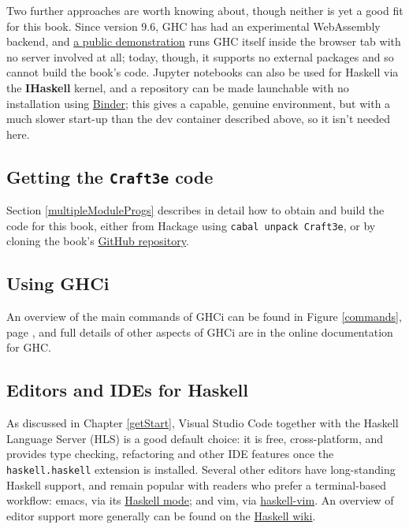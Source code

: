 Two further approaches are worth knowing about, though neither is yet a good fit for this book. Since version 9.6, GHC has had an experimental WebAssembly backend, and \href{https://haskell-wasm.github.io/ghc-in-browser/}{a public demonstration} runs GHC itself inside the browser tab with no server involved at all; today, though, it supports no external packages and so cannot build the book's code. Jupyter notebooks can also be used for Haskell via the \textbf{IHaskell} kernel, and a repository can be made launchable with no installation using \href{https://mybinder.org}{Binder}; this gives a capable, genuine environment, but with a much slower start-up than the dev container described above, so it isn't needed here.

\subsection*{Getting the \texttt{Craft3e} code}

Section \ref{multipleModuleProgs} describes in detail how to obtain and build the code for this book, either from Hackage using \texttt{cabal unpack Craft3e}, or by cloning the book's \href{https://github.com/simonjohnthompson/haskellcraft}{GitHub repository}.

\subsection*{Using GHCi}

An overview of the main commands of GHCi can be found in Figure \ref{commands}, page \pageref{commands}, and full details of other aspects of GHCi are in the online documentation for GHC.

\subsection*{Editors and IDEs for Haskell}

As discussed in Chapter \ref{getStart}, Visual Studio Code together with the Haskell Language Server (HLS) is a good default choice: it is free, cross-platform, and provides type checking, refactoring and other IDE features once the \texttt{haskell.haskell} extension is installed. Several other editors have long-standing Haskell support, and remain popular with readers who prefer a terminal-based workflow: emacs, via its \href{https://github.com/haskell/haskell-mode}{Haskell mode}; and vim, via \href{https://github.com/neovimhaskell/haskell-vim}{haskell-vim}. An overview of editor support more generally can be found on the \href{https://wiki.haskell.org/Editors}{Haskell wiki}.

